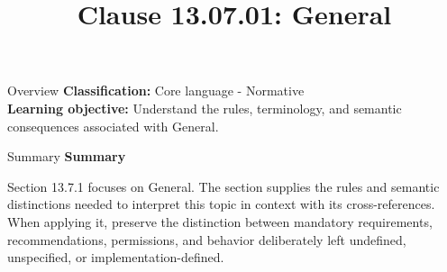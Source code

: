 \documentclass[10pt,letterpaper]{article}
\title{Clause 13.07.01: General}
\author{}
\date{}
\begin{document}
\maketitle
\begin{CornellOverviewBox}{Overview}
\textbf{Classification:} Core language - Normative\\[2pt]
\textbf{Learning objective:} Understand the rules, terminology, and semantic consequences associated with General.
\end{CornellOverviewBox}\begin{CornellSummaryBox}{Summary}
{\sffamily\bfseries\color{Accent} Summary}\par\vspace{3pt}Section 13.7.1 focuses on General. The section supplies the rules and semantic distinctions needed to interpret this topic in context with its cross-references. When applying it, preserve the distinction between mandatory requirements, recommendations, permissions, and behavior deliberately left undefined, unspecified, or implementation-defined.
\end{CornellSummaryBox}
\end{document}
